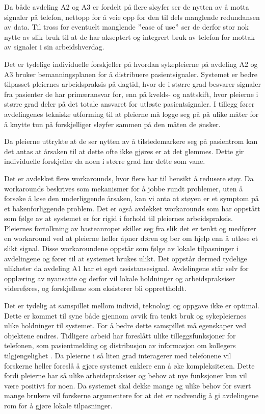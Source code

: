 \noindent
Da både avdeling A2 og A3 er fordelt på flere sløyfer ser de nytten av å motta signaler på telefon, nettopp for å veie opp for den til dels manglende redundansen av data. Til tross for eventuelt manglende $"$ease of use$"$ ser de derfor stor nok nytte av slik bruk til at de har akseptert og integrert bruk av telefon for mottak av signaler i sin arbeidshverdag.

\noindent
Det er tydelige individuelle forskjeller på hvordan sykepleierne på avdeling A2 og A3 bruker bemanningsplanen for å distribuere pasientsignaler. Systemet er bedre tilpasset pleiernes arbeidspraksis på dagtid, hvor de i større grad besvarer signaler fra pasienter de har primæransvar for, enn på kvelds- og nattskift, hvor pleierne i større grad deler på det totale ansvaret for utløste pasientsignaler. I tillegg fører avdelingenes tekniske utforming til at pleierne må logge seg på på ulike måter for å knytte tun på forskjelliger sløyfer sammen på den måten de ønsker. 

\noindent
Da pleierne uttrykte at de ser nytten av å tilstedemarkere seg på pasientrom kan det antas at årsaken til at dette ofte ikke gjøres er at det glemmes. Dette gir individuelle forskjeller da noen i større grad har dette som vane. 

\noindent
Det er avdekket flere workarounds, hvor flere har til hensikt å redusere støy. Da workarounds beskrives som mekanismer for å jobbe rundt problemer, uten å forsøke å løse den underliggende årsaken, kan vi anta at støyen er et symptom på et bakenforliggende problem. Det er også avdekket workarounds som har oppstått som følge av at systemet er for rigid i forhold til pleiernes arbeidspraksis. Pleiernes fortolkning av hasteanropet skiller seg fra slik det er tenkt og medfører en workaround ved at pleierne heller åpner døren og ber om hjelp enn å utløse et slikt signal. Disse workaroundene oppstår som følge av lokale tilpasninger i avdelingene og fører til at systemet brukes ulikt. Det oppstår dermed tydelige ulikheter da avdeling A1 har et eget assistansesignal. Avdelingene står selv for opplæring av nyansatte og derfor vil lokale holdninger og arbeidspraksiser videreføres, og forskjellene som eksisterer bli opprettholdt.    

\noindent
Det er tydelig at samspillet mellom individ, teknologi og oppgave ikke er optimal. Dette er kommet til syne både gjennom avvik fra tenkt bruk og sykepleiernes ulike holdninger til systemet. For å bedre dette samspillet må egenskaper ved objektene endres. Tidligere arbeid har foreslått ulike tilleggsfunksjoner for telefonen, som pasientmelding \citep{Rygh13, Selseth12} og distribusjon av informasjon om kollegers tilgjengelighet \citep{Sund13}. Da pleierne i så liten grad interagerer med telefonene vil forskerne heller foreslå å gjøre systemet enklere enn å øke kompleksiteten. Dette fordi pleierne har så ulike arbeidspraksiser og behov at nye funksjoner kun vil være positivt for noen. Da systemet skal dekke mange og ulike behov for svært mange brukere vil forskerne argumentere for at det er nødvendig å gi avdelingene rom for å gjøre lokale tilpasninger.